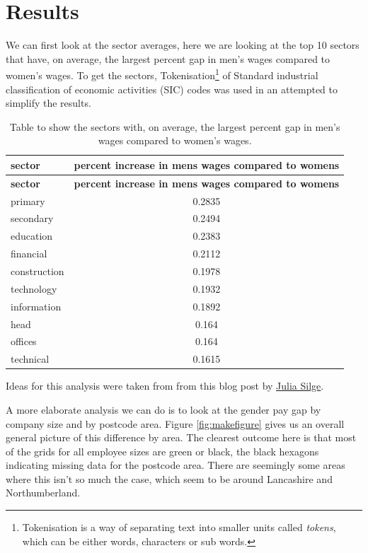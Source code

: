 \documentclass[
  11pt,
  letterpaper,
  DIV=11,
  numbers=noendperiod]{scrartcl}
\begin{document}
\newpage

\section{Results}\label{results}

We can first look at the sector averages, here we are looking at the top
10 sectors that have, on average, the largest percent gap in men's wages
compared to women's wages. To get the sectors, Tokenisation\footnote{Tokenisation
  is a way of separating text into smaller units called \emph{tokens},
  which can be either words, characters or sub words.} of Standard
industrial classification of economic activities (SIC) codes was used in
an attempted to simplify the results.

\begin{longtable}[]{@{}lc@{}}
\caption{Table to show the sectors with, on average, the largest percent
gap in men's wages compared to women's wages.}\tabularnewline
\toprule\noalign{}
\textbf{sector} & \textbf{percent increase in mens wages compared to
womens} \\
\midrule\noalign{}
\endfirsthead
\toprule\noalign{}
\textbf{sector} & \textbf{percent increase in mens wages compared to
womens} \\
\midrule\noalign{}
\endhead
\bottomrule\noalign{}
\endlastfoot
primary & 0.2835 \\
secondary & 0.2494 \\
education & 0.2383 \\
financial & 0.2112 \\
construction & 0.1978 \\
technology & 0.1932 \\
information & 0.1892 \\
head & 0.164 \\
offices & 0.164 \\
technical & 0.1615 \\
\end{longtable}

Ideas for this analysis were taken from from this blog post by
\href{https://juliasilge.com/blog/pay-gap-uk/}{Julia Silge}.

A more elaborate analysis we can do is to look at the gender pay gap by
company size and by postcode area. Figure \ref{fig:makefigure} gives us
an overall general picture of this difference by area. The clearest
outcome here is that most of the grids for all employee sizes are green
or black, the black hexagons indicating missing data for the postcode
area. There are seemingly some areas where this isn't so much the case,
which seem to be around Lancashire and Northumberland.
\end{document}
